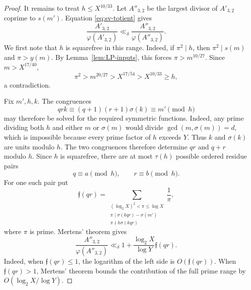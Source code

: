 \documentclass[11pt]{article}
\theoremstyle{remark}
\newcommand{\1}{\mathbf 1}
\begin{document}
\begin{proof}
It remains to treat $h\leq X^{10/33}$.  Let $A''_{3,2}$ be the largest
divisor of $A'_{3,2}$ coprime to $s(m')$.  Equation
\eqref{eq:sv-totient} gives
\[
 \frac{A'_{3,2}}{\varphi(A'_{3,2})}
 \ll_\delta\frac{A''_{3,2}}{\varphi(A''_{3,2})}.
\]
We first note that $h$ is squarefree in this range.  Indeed, if
$\pi^2\mid h$, then $\pi^2\mid s(m)$ and $\pi>y(m)$.  By
Lemma~\ref{lem:LP-inputs}, this forces $\pi>m^{10/27}$.  Since
$m>X^{17/40}$,
\[
 \pi^2>m^{20/27}>X^{17/54}>X^{10/33}\geq h,
\]
a contradiction.

Fix $m',h,k$.  The congruences
\[
 qrk\equiv(q+1)(r+1)\sigma(k)\equiv m'\pmod h
\]
may therefore be solved for the required symmetric functions.  Indeed, any prime
dividing both $h$ and either $m$ or $\sigma(m)$ would divide
$\gcd(m,\sigma(m))=d$, which is impossible because every prime factor of
$h$ exceeds $Y$.  Thus $k$ and $\sigma(k)$ are units modulo $h$.  The two
congruences therefore
determine $qr$ and $q+r$ modulo $h$.  Since $h$ is squarefree, there are at
most $\tau(h)$ possible ordered residue pairs
\[
 q\equiv a\pmod h,\qquad r\equiv b\pmod h.
\]
For one such pair put
\[
 \mathfrak f(qr)=
 \sum_{\substack{(\log_2X)^2<\pi\leq\log X\\
        \pi\mid\sigma(kqr)-\sigma(m')\\
        \pi\nmid h\sigma(kqr)}}\frac1\pi,
\]
where $\pi$ is prime.  Mertens' theorem gives
\begin{equation}\label{eq:sv-intermediate-totient}
 \frac{A''_{3,2}}{\varphi(A''_{3,2})}
 \ll_\delta 1+\frac{\log_2X}{\log Y}\mathfrak f(qr).
\end{equation}
Indeed, when $\mathfrak f(qr)\leq1$, the logarithm of the left side is
$O(\mathfrak f(qr))$.  When $\mathfrak f(qr)>1$, Mertens' theorem bounds
the contribution of the full prime range by
$O(\log_2X/\log Y)$.


\end{proof}
\end{document}
